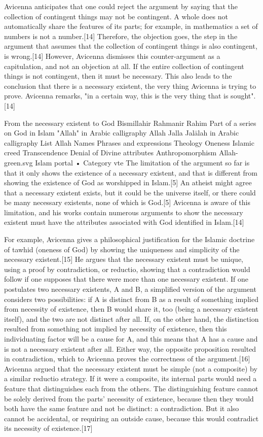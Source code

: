 Avicenna anticipates that one could reject the argument by saying that the collection of contingent things may not be contingent. A whole does not automatically share the features of its parts; for example, in mathematics a set of numbers is not a number.[14] Therefore, the objection goes, the step in the argument that assumes that the collection of contingent things is also contingent, is wrong.[14] However, Avicenna dismisses this counter-argument as a capitulation, and not an objection at all. If the entire collection of contingent things is not contingent, then it must be necessary. This also leads to the conclusion that there is a necessary existent, the very thing Avicenna is trying to prove. Avicenna remarks, "in a certain way, this is the very thing that is sought".[14]

From the necessary existent to God
Bismillahir Rahmanir Rahim
Part of a series on
God in Islam
"Allah" in Arabic calligraphy
Allah Jalla Jalālah
in Arabic calligraphy
List
Allah
Names
Phrases and expressions
Theology
Oneness
Islamic creed
Transcendence
Denial of Divine attributes
Anthropomorphism
Allah-green.svg Islam portal • Category
vte
The limitation of the argument so far is that it only shows the existence of a necessary existent, and that is different from showing the existence of God as worshipped in Islam.[5] An atheist might agree that a necessary existent exists, but it could be the universe itself, or there could be many necessary existents, none of which is God.[5] Avicenna is aware of this limitation, and his works contain numerous arguments to show the necessary existent must have the attributes associated with God identified in Islam.[14]

For example, Avicenna gives a philosophical justification for the Islamic doctrine of tawhid (oneness of God) by showing the uniqueness and simplicity of the necessary existent.[15] He argues that the necessary existent must be unique, using a proof by contradiction, or reductio, showing that a contradiction would follow if one supposes that there were more than one necessary existent. If one postulates two necessary existents, A and B, a simplified version of the argument considers two possibilities: if A is distinct from B as a result of something implied from necessity of existence, then B would share it, too (being a necessary existent itself), and the two are not distinct after all. If, on the other hand, the distinction resulted from something not implied by necessity of existence, then this individuating factor will be a cause for A, and this means that A has a cause and is not a necessary existent after all. Either way, the opposite proposition resulted in contradiction, which to Avicenna proves the correctness of the argument.[16] Avicenna argued that the necessary existent must be simple (not a composite) by a similar reductio strategy. If it were a composite, its internal parts would need a feature that distinguishes each from the others. The distinguishing feature cannot be solely derived from the parts' necessity of existence, because then they would both have the same feature and not be distinct: a contradiction. But it also cannot be accidental, or requiring an outside cause, because this would contradict its necessity of existence.[17]

